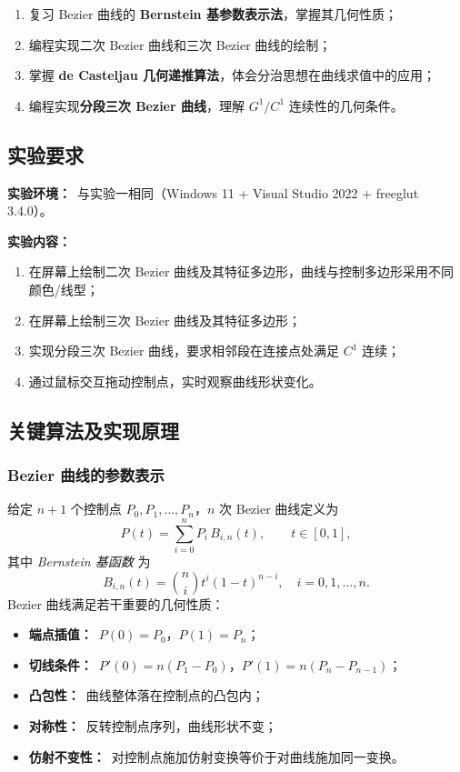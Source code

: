 \documentclass[a4paper,12pt]{ctexart}
\begin{document}
\begin{enumerate}[leftmargin=2em,itemsep=0.2em]
    \item 复习 Bezier 曲线的 \textbf{Bernstein 基参数表示法}，掌握其几何性质；
    \item 编程实现二次 Bezier 曲线和三次 Bezier 曲线的绘制；
    \item 掌握 \textbf{de Casteljau 几何递推算法}，体会分治思想在曲线求值中的应用；
    \item 编程实现\textbf{分段三次 Bezier 曲线}，理解 $G^1/C^1$ 连续性的几何条件。
\end{enumerate}

\subsection{实验要求}

\textbf{实验环境：}\ 与实验一相同（Windows 11 + Visual Studio 2022 + freeglut 3.4.0）。

\textbf{实验内容：}
\begin{enumerate}[leftmargin=2em,itemsep=0.2em]
    \item 在屏幕上绘制二次 Bezier 曲线及其特征多边形，曲线与控制多边形采用不同颜色/线型；
    \item 在屏幕上绘制三次 Bezier 曲线及其特征多边形；
    \item 实现分段三次 Bezier 曲线，要求相邻段在连接点处满足 $C^1$ 连续；
    \item 通过鼠标交互拖动控制点，实时观察曲线形状变化。
\end{enumerate}

\subsection{关键算法及实现原理}

\subsubsection{Bezier 曲线的参数表示}

给定 $n+1$ 个控制点 $P_0,P_1,\dots,P_n$，$n$ 次 Bezier 曲线定义为
\[
    P(t) = \sum_{i=0}^{n} P_i\, B_{i,n}(t),
    \qquad t\in[0,1],
\]
其中 \emph{Bernstein 基函数} 为
\[
    B_{i,n}(t) = \binom{n}{i} t^{i}(1-t)^{n-i}, \quad i=0,1,\dots,n.
\]
Bezier 曲线满足若干重要的几何性质：
\begin{itemize}[leftmargin=2em,itemsep=0.1em]
    \item \textbf{端点插值：}\ $P(0)=P_0$，$P(1)=P_n$；
    \item \textbf{切线条件：}\ $P'(0)=n(P_1-P_0)$，$P'(1)=n(P_n-P_{n-1})$；
    \item \textbf{凸包性：}\ 曲线整体落在控制点的凸包内；
    \item \textbf{对称性：}\ 反转控制点序列，曲线形状不变；
    \item \textbf{仿射不变性：}\ 对控制点施加仿射变换等价于对曲线施加同一变换。
\end{itemize}
\end{document}
